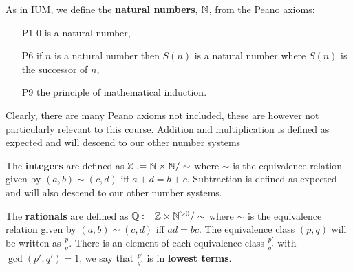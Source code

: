 \documentclass[../Year1.tex]{subfiles}
\begin{document}
\begin{definition}
    As in IUM, we define the \textbf{natural numbers}, $\mathbb{N}$, from the Peano axioms: \begin{enumerate}
        \item[P1] $0$ is a natural number,
        \item[P6] if $n$ is a natural number then $S(n)$ is a natural number where $S(n)$ is the successor of $n$,
        \item[P9] the principle of mathematical induction.
    \end{enumerate}
    Clearly, there are many Peano axioms not included, these are however not particularly relevant to this course. Addition and multiplication is defined as expected and will descend to our other number systems
\end{definition}

\begin{definition}[Integers]
    The \textbf{integers} are defined as $\mathbb{Z} := \mathbb{N}\times\mathbb{N}/\sim$ where $\sim$ is the equivalence relation given by $(a,b)\sim(c,d)$ iff $a+d = b+c$. Subtraction is defined as expected and will also descend to our other number systems.
\end{definition}

\begin{definition}[Rationals]
    The \textbf{rationals} are defined as $\mathbb{Q} := \mathbb{Z}\times\mathbb{N}^{>0}/\sim$ where $\sim$ is the equivalence relation given by $(a,b)\sim(c,d)$ iff $ad=bc$. The equivalence class $(p,q)$ will be written as $\frac{p}{q}$. There is an element of each equivalence class $\frac{p'}{q'}$ with $\gcd(p',q')=1$, we say that $\frac{p'}{q'}$ is in \textbf{lowest terms}.
\end{definition}
\end{document}
